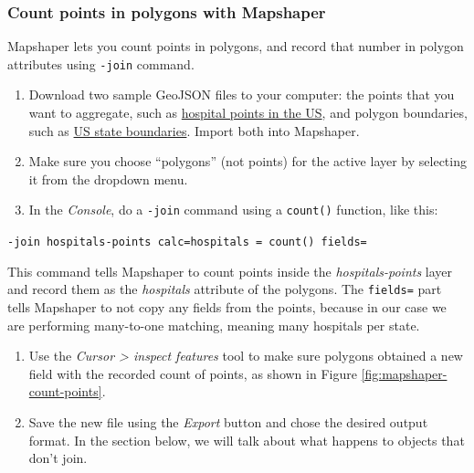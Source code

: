 \documentclass[
  english,
]{book}
\begin{document}
\hypertarget{count-points-in-polygons-with-mapshaper}{%
\subsubsection*{Count points in polygons with Mapshaper}\label{count-points-in-polygons-with-mapshaper}}

Mapshaper lets you count points in polygons, and record that number in polygon attributes using \texttt{-join} command.

\begin{enumerate}
\def\labelenumi{\arabic{enumi}.}
\item
  Download two sample GeoJSON files to your computer: the points that you want to aggregate, such as \href{data/hospitals-points.geojson}{hospital points in the US}, and polygon boundaries, such as \href{data/us-states.geojson}{US state boundaries}. Import both into Mapshaper.
\item
  Make sure you choose ``polygons'' (not points) for the active layer by selecting it from the dropdown menu.
\item
  In the \emph{Console}, do a \texttt{-join} command using a \texttt{count()} function, like this:
\end{enumerate}

\texttt{-join\ hospitals-points\ calc=\textquotesingle{}hospitals\ =\ count()\textquotesingle{}\ fields=}

This command tells Mapshaper to count points inside the \emph{hospitals-points} layer and record them as the \emph{hospitals} attribute of the polygons.
The \texttt{fields=} part tells Mapshaper to not copy any fields from the points, because in our case we are performing many-to-one matching, meaning many hospitals per state.

\begin{enumerate}
\def\labelenumi{\arabic{enumi}.}
\setcounter{enumi}{3}
\item
  Use the \emph{Cursor \textgreater{} inspect features} tool to make sure polygons obtained a new field with the recorded count of points,
  as shown in Figure \ref{fig:mapshaper-count-points}.
\item
  Save the new file using the \emph{Export} button and chose the desired output format. In the section below,
  we will talk about what happens to objects that don't join.
\end{enumerate}
\end{document}
